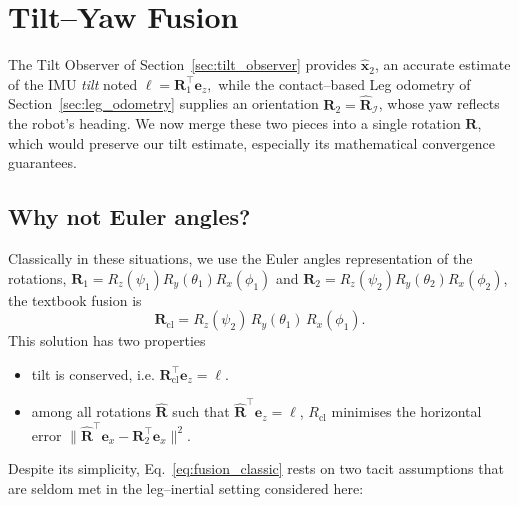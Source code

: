 \documentclass{IJCAS}
\begin{document}
\section{Tilt--Yaw Fusion}
\label{sec:axisAgnostic}

The Tilt Observer of Section~\ref{sec:tilt_observer} provides $\hat{\boldsymbol{x}}_{2}$,  an accurate
estimate of the IMU \emph{tilt} noted
\(
  \boldsymbol{\ell}=\boldsymbol{R}_{1}^{\top}\boldsymbol{e}_{z},
\)
while the contact–based Leg odometry of
Section~\ref{sec:leg_odometry} supplies an orientation \(\boldsymbol{R}_{2} = \hat{\boldsymbol{R}}_{\mathcal{I}}\), whose
yaw reflects the robot's heading.  We now merge these two pieces into a single rotation \(\boldsymbol{R}\), which would preserve our tilt estimate, especially its mathematical convergence guarantees.

\subsection{Why not Euler angles?}

Classically in these situations, we use the Euler angles representation of the rotations,
\(\boldsymbol{R}_{1}=R_{z}(\psi_{1})R_{y}(\theta_{1})R_{x}(\phi_{1})\) and
\(\boldsymbol{R}_{2}=R_{z}(\psi_{2})R_{y}(\theta_{2})R_{x}(\phi_{2})\),
the textbook fusion is
\begin{equation}
  \boldsymbol{R}_{\mathrm{cl}}
  =R_{z}(\psi_{2})\,R_{y}(\theta_{1})\,R_{x}(\phi_{1}).
  \label{eq:fusion_classic}
\end{equation}
This solution has two properties
\begin{itemize}[leftmargin=0em]
\item tilt is conserved, i.e. 
\(\boldsymbol{R}_{\mathrm{cl}}^{\top}\boldsymbol{e}_{z}=\boldsymbol{\ell}\).
\item among all rotations \(\hat{\boldsymbol{R}}\) such that
\(\hat{\boldsymbol{R}}^{\top}\boldsymbol{e}_{z}=\boldsymbol{\ell}\),
\(R_{\mathrm{cl}}\) minimises the horizontal error
\(
  \|
    \hat{\boldsymbol{R}}^{\top}\boldsymbol{e}_{x}-\boldsymbol{R}_{2}^{\top}\boldsymbol{e}_{x}
  \|^{2}.
\)
\end{itemize}


Despite its simplicity, Eq.~\eqref{eq:fusion_classic} rests on two tacit
assumptions that are seldom met in the leg–inertial setting considered
here:
\end{document}

